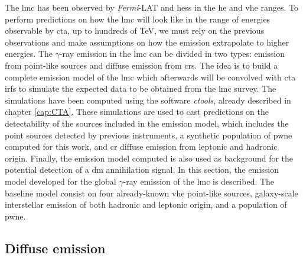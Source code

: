 \documentclass[main.tex]{subfiles}
\begin{document}
The \gls{lmc} has been observed by \textit{Fermi}-LAT and \gls{hess} in the \gls{he} and \gls{vhe} ranges. To perform predictions on how the \gls{lmc} will look like in the range of energies observable by \gls{cta}, up to hundreds of TeV, we must rely on the previous observations and make assumptions on how the emission extrapolate to higher energies. The $\gamma$-ray emission in the \gls{lmc} can be divided in two types: emission from point-like sources and diffuse emission from \glspl{cr}. The idea is to build a complete emission model of the \gls{lmc} which afterwards will be convolved with \gls{cta} \glspl{irf} to simulate the expected data to be obtained from the \gls{lmc} survey. The simulations have been computed using the software \textit{ctools}, already described in chapter \ref{cap:CTA}. These simulations are used to cast predictions on the detectability of the sources included in the emission model, which includes the point sources detected by previous instruments, a synthetic population of \gls{pwne} computed for this work, and \gls{cr} diffuse emission from leptonic and hadronic origin. Finally, the emission model computed is also used as background for the potential detection of a \gls{dm} annihilation signal.
In this section, the emission model developed for the global $\gamma$-ray emission of the \gls{lmc} is described. The baseline model consist on four already-known \gls{vhe} point-like sources, galaxy-scale interstellar emission of both hadronic and leptonic origin, and a population of \gls{pwne}. 

\subsection{Diffuse emission} \label{sec:diffusemodel}
\end{document}
